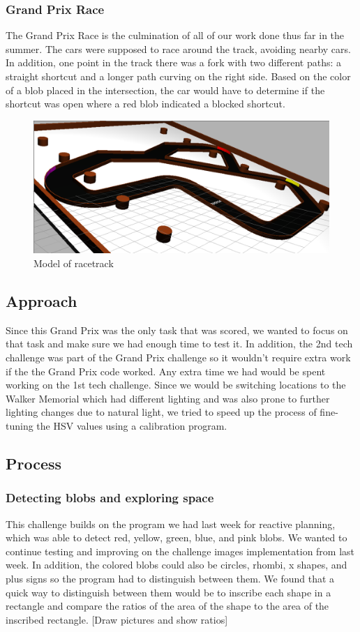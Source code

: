 \documentclass[journal, a4paper]{IEEEtran}
\begin{document}
\subsubsection{Grand Prix Race}
The Grand Prix Race is the culmination of all of our work done thus far in the summer. The cars were supposed to race around the track, avoiding nearby cars. In addition, one point in the track there was a fork with two different paths: a straight shortcut and a longer path curving on the right side. Based on the color of a blob placed in the intersection, the car would have to determine if the shortcut was open where a red blob indicated a blocked shortcut. 
\begin{figure}[H]
\includegraphics[scale=.20]{gazebo_track.png}
\caption{Model of racetrack \cite{gazebo_pic}} 
\end{figure}
\subsection{Approach}
Since this Grand Prix was the only task that was scored, we wanted to focus on that task and make sure we had enough time to test it. In addition, the 2nd tech challenge was part of the Grand Prix challenge so it wouldn't require extra work if the the Grand Prix code worked. Any extra time we had would be spent working on the 1st tech challenge. Since we would be switching locations to the Walker Memorial which had different lighting and was also prone to further lighting changes due to natural light, we tried to speed up the process of fine-tuning the HSV values using a calibration program.
\subsection{Process}
\subsubsection{Detecting blobs and exploring space}
This challenge builds on the program we had last week for reactive planning, which was able to detect red, yellow, green, blue, and pink blobs. We wanted to continue testing and improving on the challenge images implementation from last week. In addition, the colored blobs could also be circles, rhombi, x shapes, and plus signs so the program had to distinguish between them. We found that a quick way to distinguish between them would be to inscribe each shape in a rectangle and compare the ratios of the area of the shape to the area of the inscribed rectangle. [Draw pictures and show ratios]
\end{document}
